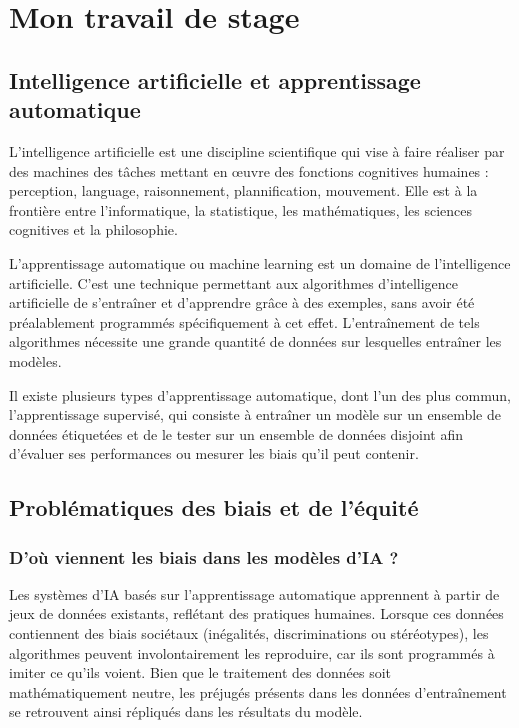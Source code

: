 \documentclass[12pt, letterpaper]{article}
\begin{document}
\pagebreak
\section{Mon travail de stage}
\subsection{Intelligence artificielle et apprentissage automatique}

L'intelligence artificielle est une discipline scientifique qui vise à faire réaliser par des machines des tâches mettant en \oe{}uvre des fonctions cognitives 
humaines : perception, language, raisonnement, plannification, mouvement. Elle est à la frontière entre l'informatique, 
la statistique, les mathématiques, les sciences cognitives et la philosophie.

L'apprentissage automatique ou machine learning est un domaine de l'intelligence artificielle. C'est une technique
permettant aux algorithmes d'intelligence artificielle de s'entraîner et d'apprendre grâce à
des exemples, sans avoir été préalablement programmés spécifiquement à cet effet.
L'entraînement de tels algorithmes nécessite une grande quantité de données
sur lesquelles entraîner les modèles.

Il existe plusieurs types d'apprentissage automatique, dont l'un des plus commun, l'apprentissage supervisé, qui consiste à entraîner un modèle sur un
 ensemble de données étiquetées et de le tester sur un ensemble de données disjoint afin d'évaluer ses performances ou mesurer les biais qu'il peut contenir. 

\subsection{Problématiques des biais et de l'équité}

    \subsubsection*{D'où viennent les biais dans les modèles d'IA ?}
    Les systèmes d'IA basés sur l'apprentissage automatique apprennent à partir de jeux de données existants, reflétant des pratiques humaines. Lorsque ces données 
    contiennent des biais sociétaux (inégalités, discriminations ou stéréotypes), les algorithmes peuvent involontairement les reproduire, car ils sont programmés 
    à imiter ce qu'ils voient. Bien que le traitement des données soit mathématiquement neutre, les préjugés présents dans les données d'entraînement se retrouvent 
    ainsi répliqués dans les résultats du modèle.
\end{document}

